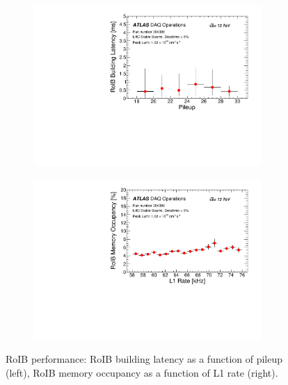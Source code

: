 \begin{figure}[t!]
\centering
\begin{subfigure}[t]{0.48\textwidth}
\includegraphics[width=0.95\textwidth]{GrAssym_run_304008_pileup_RoIBbuildtime}
\end{subfigure}
\begin{subfigure}[t]{0.48\textwidth}
\includegraphics[width=0.95\textwidth]{hProf_run_304008_l1rate_RoIBMemOccup}
\end{subfigure}
\vspace{-0.25cm}
\caption{RoIB performance: RoIB building latency as a function of pileup (left), RoIB memory occupancy as a function of L1 rate (right).}
\label{fig:roib_pileup_l1rate}
\end{figure} 



